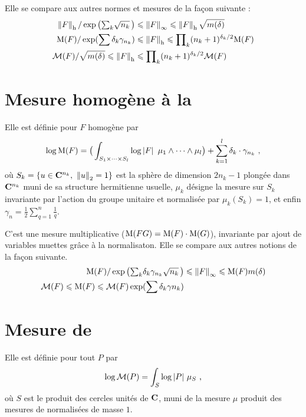Elle se compare aux autres normes et mesures de la façon suivante :
\begin{align}
  \left\lVert F\right\rVert_{\mathrm h} / \exp\big( {\textstyle\sum_k} \sqrt{n_k} \,\big)
  & \leqslant \left\lVert F\right\rVert_\infty
  \leqslant \left\lVert F\right\rVert_{\mathrm h} \sqrt{m(\delta)}
  \\
  \mathrm{M}(F) / \exp(\sum\delta_k\gamma_{n_k})
  & \leqslant \left\lVert F\right\rVert_{\mathrm h}
  \leqslant \prod\nolimits_k (n_k +1)^{\delta_k/2} \mathrm{M}(F)
  \\
  \mathcal{M}(F) / \sqrt{m(\delta)}
  \leqslant \left\lVert F\right\rVert_{\mathrm h}
  & \leqslant \prod\nolimits_k (n_k +1)^{\delta_k/2} \mathcal{M}(F)
\end{align}

\section{Mesure homogène à la \texorpdfstring{}{Philippon}}

Elle est définie pour $F$ homogène par
\[
  \log \mathrm{M}(F)
  = \big(
  \int_{S_{1}\times\cdots\times S_{l}}
  \log\left\lvert F\right\rvert\ \mu_1 \wedge \cdots \wedge \mu_l
  \big) + \sum_{k=1}^l \delta_k \cdot \gamma_{n_k}
  \text{ ,}
\]
où $S_k = \{ u \in \C^{n_k},\ \normeuc u = 1 \}$ est la sphère de dimension
$2n_k-1$ plongée dans $\mathbf{C}^{n_k}$ muni de sa structure hermitienne usuelle,
$\mu_k$ désigne la mesure sur $S_k$ invariante par l'action du groupe unitaire
et normalisée par $\mu_k(S_k) = 1$, et enfin $\gamma_n = \frac12
\sum_{q=1}^{n} \frac1q$.

C'est une mesure multiplicative ($\mathrm{M}(FG) = \mathrm{M}(F) \cdot \mathrm{M}(G)$),
invariante par ajout de variables muettes grâce à la normalisaton.  Elle se compare aux autres
notions de la façon suivante.
\begin{align}
  \mathrm{M}(F) / \exp\big(
    {\textstyle\sum_k} \delta_k \gamma_{n_k} \sqrt{n_k}
  \,\big)
  & \leqslant \left\lVert F\right\rVert_\infty
  \leqslant \mathrm{M}(F) m(\delta)
  \\
  \mathcal{M}(F)
  \leqslant \mathrm{M}(F)
  \leqslant \mathcal{M}(F) \exp(\sum\delta_k\gamma{n_k})
\end{align}

\section{Mesure de \texorpdfstring{}{Mahler}}

Elle est définie pour tout $P$ par
\[
  \log\mathcal{M}(P)
  = \int_S \log\left\lvert P\right\rvert\, \mu_S \text{ ,}
\]
où $S$ est le produit des cercles unités de $\mathbf{C}$, muni de la mesure $\mu$
produit des mesures de  normalisées de masse $1$.

